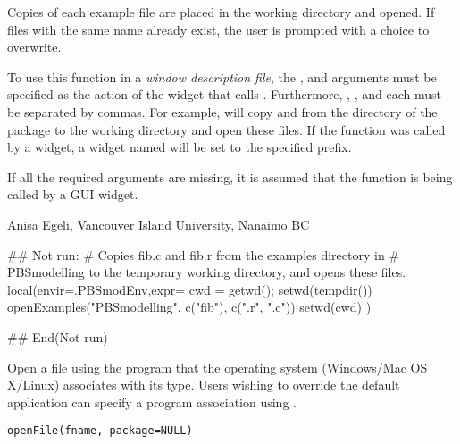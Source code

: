 \documentclass[letterpaper]{book}
\begin{document}
%
\begin{Details}\relax
Copies of each example file are placed in the working directory 
and opened. If files with the same name already exist, the user 
is prompted with a choice to overwrite.

To use this function in a \emph{window description file}, the 
,  and  arguments must 
be specified as the action of the widget that calls 
. Furthermore, , , 
and each  must be separated by commas. For example, 
 will copy  
and  from the  directory of the 
package  to the working directory and open these 
files. If the function was called by a widget, a widget named 
 will be set to the specified prefix.
\end{Details}
%
\begin{Note}\relax
If all the required arguments are missing, it is assumed 
that the function is being called by a GUI widget.
\end{Note}
%
\begin{Author}\relax
Anisa Egeli, Vancouver Island University, Nanaimo BC
\end{Author}
%
\begin{SeeAlso}\relax
{}
\end{SeeAlso}
%
\begin{Examples}
\begin{ExampleCode}
## Not run: 
# Copies fib.c and fib.r from the examples directory in 
# PBSmodelling to the temporary working directory, and opens these files.
local(envir=.PBSmodEnv,expr={
  cwd = getwd(); setwd(tempdir())
  openExamples("PBSmodelling", c("fib"), c(".r", ".c"))
  setwd(cwd)
})

## End(Not run)
\end{ExampleCode}
\end{Examples}
%
\begin{Description}\relax
Open a file using the program that the operating system (Windows/Mac
OS X/Linux) associates with its type.  Users wishing to override the
default application can specify a program association using
.
\end{Description}
%
\begin{Usage}
\begin{verbatim}
openFile(fname, package=NULL)
\end{verbatim}
\end{Usage}
\end{document}
